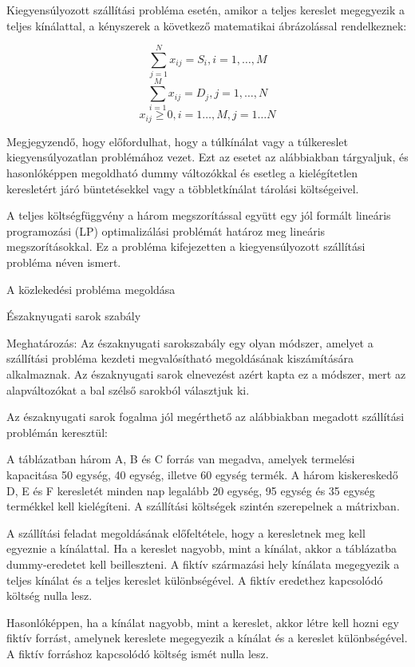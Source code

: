 Kiegyensúlyozott szállítási probléma esetén, amikor a teljes kereslet megegyezik a teljes kínálattal, a kényszerek a következő matematikai ábrázolással rendelkeznek:

$$\sum_{j=1}^N x_{ij} = S_{i}, i=1, …, M$$
$$\sum_{i=1}^M x_{ij} = D_{j}, j=1, …, N$$
$$x_{ij} \geqslant 0, i=1 …,M, j=1 …N$$

Megjegyzendő, hogy előfordulhat, hogy a túlkínálat vagy a túlkereslet kiegyensúlyozatlan problémához vezet. Ezt az esetet az alábbiakban tárgyaljuk, és hasonlóképpen megoldható dummy változókkal és esetleg a kielégítetlen keresletért járó büntetésekkel vagy a többletkínálat tárolási költségeivel.

A teljes költségfüggvény a három megszorítással együtt egy jól formált lineáris programozási (LP) optimalizálási problémát határoz meg lineáris megszorításokkal. Ez a probléma kifejezetten a kiegyensúlyozott szállítási probléma néven ismert.

A közlekedési probléma megoldása


Északnyugati sarok szabály

Meghatározás: Az északnyugati sarokszabály egy olyan módszer, amelyet a szállítási probléma kezdeti megvalósítható megoldásának kiszámítására alkalmaznak. Az északnyugati sarok elnevezést azért kapta ez a módszer, mert az alapváltozókat a bal szélső sarokból választjuk ki.

Az északnyugati sarok fogalma jól megérthető az alábbiakban megadott szállítási problémán keresztül:


A táblázatban három A, B és C forrás van megadva, amelyek termelési kapacitása 50 egység, 40 egység, illetve 60 egység termék. A három kiskereskedő D, E és F keresletét minden nap legalább 20 egység, 95 egység és 35 egység termékkel kell kielégíteni. A szállítási költségek szintén szerepelnek a mátrixban.

A szállítási feladat megoldásának előfeltétele, hogy a keresletnek meg kell egyeznie a kínálattal. Ha a kereslet nagyobb, mint a kínálat, akkor a táblázatba dummy-eredetet kell beilleszteni. A fiktív származási hely kínálata megegyezik a teljes kínálat és a teljes kereslet különbségével. A fiktív eredethez kapcsolódó költség nulla lesz.

Hasonlóképpen, ha a kínálat nagyobb, mint a kereslet, akkor létre kell hozni egy fiktív forrást, amelynek kereslete megegyezik a kínálat és a kereslet különbségével. A fiktív forráshoz kapcsolódó költség ismét nulla lesz.

